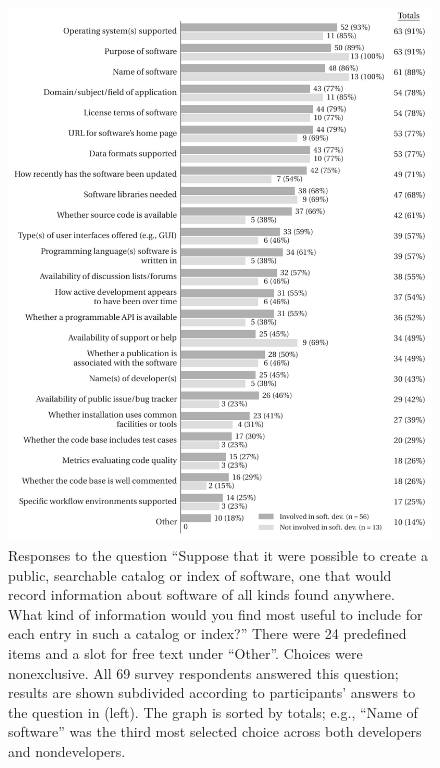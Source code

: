 \documentclass{casicswhitepaper}
\begin{document}
\begin{figure}[t]
  \vspace*{-1ex}
  \centering
  \includegraphics{files/plots/info-to-include-in-index-v5.pdf}
  \vspace*{-5ex}
  \caption{Responses to the question ``Suppose that it were possible to create a public, searchable catalog or index of software, one that would record information about software of all kinds found anywhere.  What kind of information would you find most useful to include for each entry in such a catalog or index?'' There were 24 predefined items and a slot for free text under ``Other''.  Choices were nonexclusive.  All 69 survey respondents answered this question; results are shown subdivided according to participants' answers to the question in  (left).  The graph is sorted by totals; e.g., ``Name of software'' was the third most selected choice across both developers and nondevelopers.}
  \label{info-to-include}
\end{figure}

% 
\end{document}
